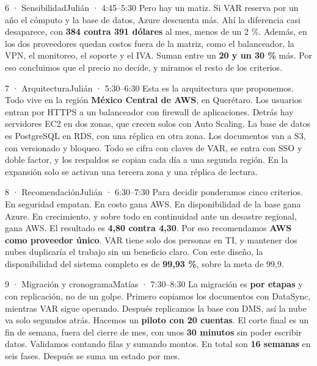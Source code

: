 \documentclass[11pt]{article}
\begin{document}
\begin{lamina}{6 · Sensibilidad}{Julián · 4:45--5:30}
Pero hay un matiz. Si VAR reserva por un año el cómputo y la base de datos, Azure descuenta más. Ahí la diferencia casi desaparece, con \textbf{384 contra 391 dólares} al mes, menos de un 2 \%. Además, en los dos proveedores quedan costos fuera de la matriz, como el balanceador, la VPN, el monitoreo, el soporte y el IVA. Suman entre un \textbf{20 y un 30 \%} más. Por eso concluimos que el precio no decide, y miramos el resto de los criterios.
\end{lamina}

\begin{lamina}{7 · Arquitectura}{Julián · 5:30--6:30}
Esta es la arquitectura que proponemos. Todo vive en la región \textbf{México Central de AWS}, en Querétaro. Los usuarios entran por HTTPS a un balanceador con firewall de aplicaciones. Detrás hay servidores EC2 en dos zonas, que crecen solos con Auto Scaling. La base de datos es PostgreSQL en RDS, con una réplica en otra zona. Los documentos van a S3, con versionado y bloqueo. Todo se cifra con claves de VAR, se entra con SSO y doble factor, y los respaldos se copian cada día a una segunda región. En la expansión solo se activan una tercera zona y una réplica de lectura.
\end{lamina}

\begin{lamina}{8 · Recomendación}{Julián · 6:30--7:30}
Para decidir ponderamos cinco criterios. En seguridad empatan. En costo gana AWS. En disponibilidad de la base gana Azure. En crecimiento, y sobre todo en continuidad ante un desastre regional, gana AWS. El resultado es \textbf{4,80 contra 4,30}. Por eso recomendamos \textbf{AWS como proveedor único}. VAR tiene solo dos personas en TI, y mantener dos nubes duplicaría el trabajo sin un beneficio claro. Con este diseño, la disponibilidad del sistema completo es de \textbf{99,93 \%}, sobre la meta de 99,9.
\end{lamina}

\begin{lamina}{9 · Migración y cronograma}{Matías · 7:30--8:30}
La migración es \textbf{por etapas} y con replicación, no de un golpe. Primero copiamos los documentos con DataSync, mientras VAR sigue operando. Después replicamos la base con DMS, así la nube va solo segundos atrás. Hacemos un \textbf{piloto con 20 cuentas}. El corte final es un fin de semana, fuera del cierre de mes, con unos \textbf{30 minutos} sin poder escribir datos. Validamos contando filas y sumando montos. En total son \textbf{16 semanas} en seis fases. Después se suma un estado por mes.
\end{lamina}
\end{document}
